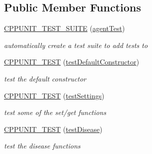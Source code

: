 \subsection*{Public Member Functions}
\begin{DoxyCompactItemize}
\item 
\mbox{\label{classagentTest_a948c6b1acfe35387e5c64612baa946b5}} 
\mbox{\hyperlink{classagentTest_a948c6b1acfe35387e5c64612baa946b5}{C\+P\+P\+U\+N\+I\+T\+\_\+\+T\+E\+S\+T\+\_\+\+S\+U\+I\+TE}} (\mbox{\hyperlink{classagentTest}{agent\+Test}})
\begin{DoxyCompactList}\small\item\em automatically create a test suite to add tests to \end{DoxyCompactList}\item 
\mbox{\label{classagentTest_af781fb1217505d9383a1d0f7de6da73f}} 
\mbox{\hyperlink{classagentTest_af781fb1217505d9383a1d0f7de6da73f}{C\+P\+P\+U\+N\+I\+T\+\_\+\+T\+E\+ST}} (\mbox{\hyperlink{classagentTest_ade6fc2895d439529b21d4fb725302b77}{test\+Default\+Constructor}})
\begin{DoxyCompactList}\small\item\em test the default constructor \end{DoxyCompactList}\item 
\mbox{\label{classagentTest_a85678ef4ae878bc43397deae1bdd2b44}} 
\mbox{\hyperlink{classagentTest_a85678ef4ae878bc43397deae1bdd2b44}{C\+P\+P\+U\+N\+I\+T\+\_\+\+T\+E\+ST}} (\mbox{\hyperlink{classagentTest_ad39e9d21138b56f55a29ced6fdba8e58}{test\+Settings}})
\begin{DoxyCompactList}\small\item\em test some of the set/get functions \end{DoxyCompactList}\item 
\mbox{\label{classagentTest_a4b0cf2b0288ecd554a74ee8e5c1f2338}} 
\mbox{\hyperlink{classagentTest_a4b0cf2b0288ecd554a74ee8e5c1f2338}{C\+P\+P\+U\+N\+I\+T\+\_\+\+T\+E\+ST}} (\mbox{\hyperlink{classagentTest_a628c4b06eee5b0e6e7a45c842ed70429}{test\+Disease}})
\begin{DoxyCompactList}\small\item\em test the disease functions \end{DoxyCompactList}\item 

\end{DoxyCompactItemize}
